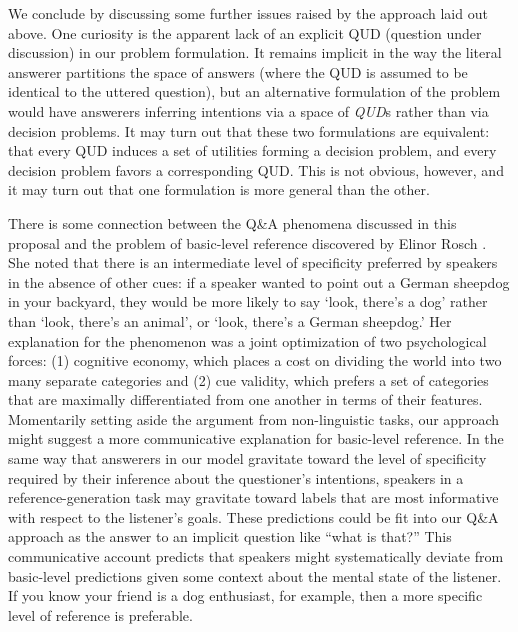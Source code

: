 \documentclass[12pt]{amsart}
\begin{document}
We conclude by discussing some further issues raised by the approach laid out above. One curiosity is the apparent lack of an explicit QUD (question under discussion) in our problem formulation. It remains implicit in the way the literal answerer partitions the space of answers (where the QUD is assumed to be identical to the uttered question), but an alternative formulation of the problem would have answerers inferring intentions via a space of \emph{QUD}s rather than via decision problems. It may turn out that these two formulations are equivalent: that every QUD induces a set of utilities forming a decision problem, and every decision problem favors a corresponding QUD. This is not obvious, however, and it may turn out that one formulation is more general than the other. 

There is some connection between the Q\&A phenomena discussed in this proposal and the problem of basic-level reference discovered by Elinor Rosch \cite{RoschMervisGray___BoyesBraem76_BasicObjects}. She noted that there is an intermediate level of specificity preferred by speakers in the absence of other cues: if a speaker wanted to point out a German sheepdog in your backyard, they would be more likely to say `look, there's a dog' rather than `look, there's an animal', or `look, there's a German sheepdog.' Her explanation for the phenomenon was a joint optimization of two psychological forces: (1) cognitive economy, which places a cost on dividing the world into two many separate categories and (2) cue validity, which prefers a set of categories that are maximally differentiated from one another in terms of their features. Momentarily setting aside the argument from non-linguistic tasks, our approach might suggest a more communicative explanation for basic-level reference. In the same way that answerers in our model gravitate toward the level of specificity required by their inference about the questioner's intentions, speakers in a reference-generation task may gravitate toward labels that are most informative with respect to the listener's goals. These predictions could be fit into our Q\&A approach as the answer to an implicit question like ``what is that?'' This communicative account predicts that speakers might systematically deviate from basic-level predictions given some context about the mental state of the listener. If you know your friend is a dog enthusiast, for example, then a more specific level of reference is preferable. 
\end{document}
